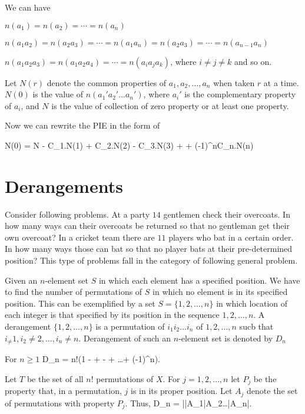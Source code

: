 We can have

\startitemize[n]
\item $n(a_1) = n(a_2) = \cdots = n(a_n)$
\item $n(a_1a_2) = n(a_2a_3) = \cdots = n(a_1a_n) = n(a_2a_3) = \cdots = n(a_{n - 1}a_n)$
\item $n(a_1a_2a_3) = n(a_1a_2a_4) = \cdots = n(a_ia_ja_k)$, where $i\neq j\neq k$
\stopitemize
and so on.

Let $N(r)$ denote the common properties of $a_1, a_2, \ldots, a_n$ when taken $r$ at a time. $N(0)$ is the
value of $n(a_1'a_2'\ldots a_n')$, where $a_i'$ is the complementary property of $a_i$, and $N$ is the value
of collection of zero property or at least one property.

Now we can rewrite the PIE in the form of

\startformula
  N(0) = N - C_1^^nN(1) + C_2^^nN(2) - C_3^^nN(3) + \cdots + (-1)^nC_n^^nN(n)
\stopformula
\section{Derangements}
Consider following problems. At a party $14$ gentlemen check their overcoats. In how many ways can their overcoats be returned so
that no gentleman get their own overcoat? In a cricket team there are $11$ players who bat in a certain order. In how many ways
those can bat so that no player bats at their pre-determined position? This type of problems fall in the category of following
general problem.

Given an $n$-element set $S$ in which each element has a specified position. We have to find the number of permutations of $S$ in
which no element is in its specified position. This can be exemplified by a set $S = \{1, 2, \ldots, n\}$ in which location of each
integer is that specified by its position in the sequence $1, 2, \ldots, n$. A derangement $\{1, 2, \ldots, n\}$ is a permutation
of $i_1i_2\ldots i_n$ of $1, 2, \ldots, n$ sucb that $i_\neq 1, i_2\neq 2, \ldots, i_n\neq n$. Derangement of such an $n$-element
set is denoted by $D_n$

For $n\geq 1$ \startformula D_n = n!\left(1 -  +  -  + \ldots + (-1)^n\right).\stopformula

Let $T$ be the set of all $n!$ permutations of $X$. For $j = 1, 2, \ldots, n$ let $P_j$ be the property that, in a permutation, $j$
is in its proper position. Let $A_j$ denote the set of permutations with property $P_j$. Thus, \startformula D_n = |\bar{A_1}\cap\bar{A_2}\cap\ldots\cap\bar{A_n}|.\stopformula

